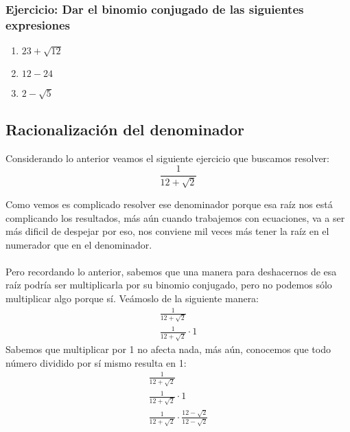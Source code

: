 \documentclass[a4paper]{article}
\begin{document}
\subsubsection{Ejercicio: Dar el binomio conjugado de las siguientes expresiones}
\begin{enumerate}
    \item $23+\sqrt{12}$
    \item $12 - 24$
    \item $2 - \sqrt{5}$
\end{enumerate}

\subsection{Racionalización del denominador}
Considerando lo anterior veamos el siguiente ejercicio que buscamos resolver:
\begin{equation*}
    \frac{1}{12+\sqrt{2}}
\end{equation*}

Como vemos es complicado resolver ese denominador porque esa raíz nos está complicando los resultados, más aún cuando trabajemos con ecuaciones, va a ser más dificil de despejar por eso, nos conviene mil veces más tener la raíz en el numerador que en el denominador.\\\\
Pero recordando lo anterior, sabemos que una manera para deshacernos de esa raíz podría ser multiplicarla por su binomio conjugado, pero no podemos sólo multiplicar algo porque sí. Veámoslo de la siguiente manera:
\begin{gather*}
    \frac{1}{12+\sqrt{2}}\\
    \frac{1}{12+\sqrt{2}} \cdot 1 
\end{gather*}
Sabemos que multiplicar por 1 no afecta nada, más aún, conocemos que todo número dividido por sí mismo resulta en 1:
\begin{gather*}
    \frac{1}{12+\sqrt{2}}\\
    \frac{1}{12+\sqrt{2}} \cdot 1 \\
    \frac{1}{12+\sqrt{2}} \cdot \frac{12-\sqrt{2}}{12-\sqrt{2}}
\end{gather*}
\end{document}
